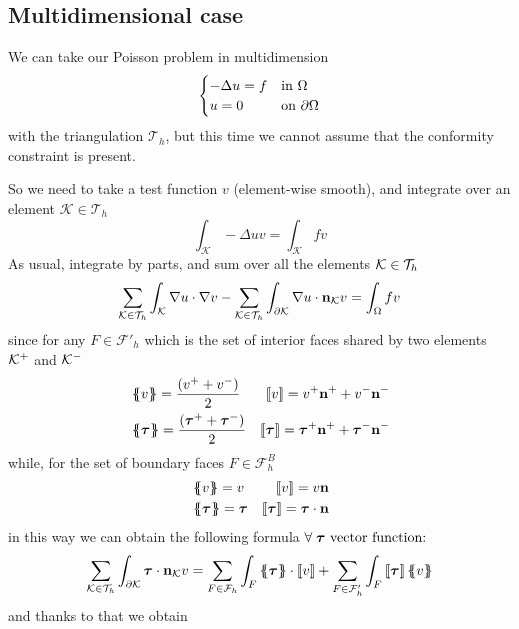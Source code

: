 \subsection{Multidimensional case}
We can take our Poisson problem in multidimension 
\begin{equation}
    \begin{cases}
        -\Delta u = f & \text{in } \Omega \\
        u = 0 & \text{on }\partial\Omega
    \end{cases}\label{Poisson_multidim_dg}
\end{equation}
with the triangulation \(\mathcal{T}_h\), but this time we cannot assume that the conformity constraint is present. 

So we need to take a test function \(v\) (element-wise smooth), and integrate over an element \(\mathcal{K} \in \mathcal{T}_h\)
\[
    \int_{\mathcal{K}} -\Delta u v = \int_{\mathcal{K}} fv
\]
As usual, integrate by parts, and sum over all the elements \(\mathcal{K} \in \mathcal{T}_h\) 
\[
    \sum_{\mathcal{K} \in \mathcal{T}_h} \int_{\mathcal{K}}\nabla u \cdot \nabla v - \sum_{\mathcal{K} \in \mathcal{T}_h} \int_{\partial\mathcal{K}} \nabla u \cdot \textbf{n}_{\mathcal{K}} v = \int_{\Omega} fv
\]
since for any \(F \in \mathcal{F}'_h\) which is the set of interior faces shared by two elements \(\mathcal{K}^+\) and \(\mathcal{K}^-\)
\begin{align*}
    &\average{v} = \frac{(v^+ + v^-)}{2}  & \jump{v} = v^+ \vect{n}^+ + v^- \vect{n}^-\\
    &\average{\bm{\tau}} = \frac{(\bm{\tau}^+ + \bm{\tau}^-)}{2} & \jump{\bm{\tau}} = \bm{\tau}^+ \vect{n}^+ + \bm{\tau}^- \vect{n}^-
\end{align*}
while, for the set of boundary faces \(F \in \mathcal{F}^B_h\)
\begin{align*}
    &\average{v} = v & \jump{v} = v \vect{n} \\
    &\average{\bm{\tau}} = \bm{\tau} & \jump{\bm{\tau}} = \bm{\tau} \cdot \vect{n}
\end{align*}
in this way we can obtain the following formula \(\forall \;\bm{\tau} \text{ vector function: }
\)
\begin{equation}
    \sum_{\element \in \triangulation} \int_{\partial\element} \bm{\tau} \cdot \vect{n}_{\element} v = \sum_{F \in \mathcal{F}_h}\int_F\average{\bm{\tau}} \cdot \jump{v} + \sum_{F \in \mathcal{F}'_h} \int_{F}\jump{\bm{\tau}}\average{v} \label{magic_formula_multidim_dg}
\end{equation}
and thanks to that we obtain 
